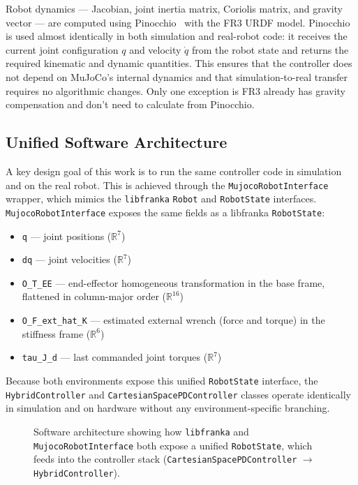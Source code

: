 \documentclass[
	german,%
	accentcolor=9c,%
	ruledheaders=section,%
	class=report,%
	thesis={type=bachelor},%
	fontsize=11pt,%
	parskip=half-,%
	custommargins=true,%
	marginpar=false,%
]{tudapub}
\begin{document}
Robot dynamics — Jacobian, joint inertia matrix, Coriolis matrix, and gravity
vector — are computed using Pinocchio~\cite{pinocchio} with the FR3 URDF model.
Pinocchio is used almost identically in both simulation and real-robot code: it
receives the current joint configuration \(q\) and velocity \(\dot{q}\) from
the robot state and returns the required kinematic and dynamic quantities.
This ensures that the controller does not depend on MuJoCo's internal dynamics
and that simulation-to-real transfer requires no algorithmic changes. Only one exception is FR3 already has gravity compensation and don't need to calculate from Pinocchio.

\subsection{Unified Software Architecture}
\label{sec:unified_arch}

A key design goal of this work is to run the same controller code in
simulation and on the real robot.
This is achieved through the \texttt{MujocoRobotInterface} wrapper, which
mimics the \texttt{libfranka} \texttt{Robot} and \texttt{RobotState}
interfaces.
\texttt{MujocoRobotInterface} exposes the same fields as a libfranka
\texttt{RobotState}:
\begin{itemize}
    \item \texttt{q} — joint positions (\(\mathbb{R}^7\))
    \item \texttt{dq} — joint velocities (\(\mathbb{R}^7\))
    \item \texttt{O\_T\_EE} — end-effector homogeneous transformation in the
          base frame, flattened in column-major order (\(\mathbb{R}^{16}\))
    \item \texttt{O\_F\_ext\_hat\_K} — estimated external wrench (force and
          torque) in the stiffness frame (\(\mathbb{R}^6\))
    \item \texttt{tau\_J\_d} — last commanded joint torques (\(\mathbb{R}^7\))
\end{itemize}
Because both environments expose this unified \texttt{RobotState} interface,
the \texttt{HybridController} and \texttt{CartesianSpacePDController} classes
operate identically in simulation and on hardware without any
environment-specific branching.

\begin{figure}[htbp]
    \centering
    \caption{Software architecture showing how \texttt{libfranka} and
             \texttt{MujocoRobotInterface} both expose a unified
             \texttt{RobotState}, which feeds into the controller stack
             (\texttt{CartesianSpacePDController} $\to$
             \texttt{HybridController}).}
    \label{fig:system_architecture}
\end{figure}
\end{document}
